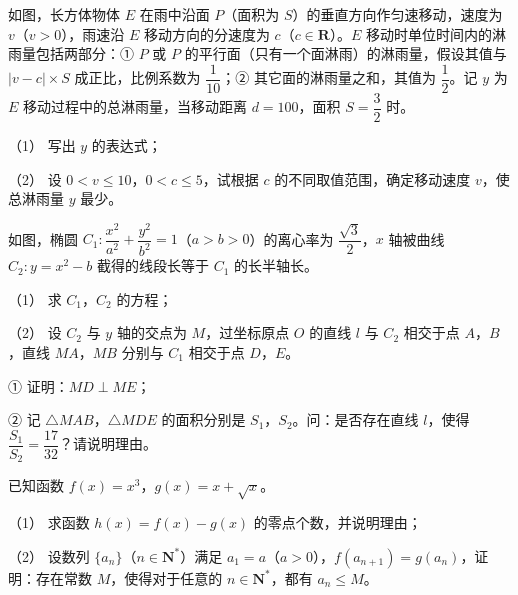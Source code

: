 \begin{question}
如图，长方体物体 $E$ 在雨中沿面 $P$（面积为 $S$）的垂直方向作匀速移动，速度为 $v$（$v>0$），雨速沿 $E$ 移动方向的分速度为 $c$（$c\in\mathbf R$）。$E$ 移动时单位时间内的淋雨量包括两部分：① $P$ 或 $P$ 的平行面（只有一个面淋雨）的淋雨量，假设其值与 $|v-c|\times S$ 成正比，比例系数为 $\dfrac1{10}$；② 其它面的淋雨量之和，其值为 $\dfrac12$。记 $y$ 为 $E$ 移动过程中的总淋雨量，当移动距离 $d=100$，面积 $S=\dfrac32$ 时。

（1） 写出 $y$ 的表达式；

（2） 设 $0<v\leqslant10$，$0<c\leqslant5$，试根据 $c$ 的不同取值范围，确定移动速度 $v$，使总淋雨量 $y$ 最少。
\nopagebreak[4]
\begin{center}\end{center}
\nopagebreak[4]
\Needspace{0.4\textheight}
\end{question}
\begin{question}
如图，椭圆 $C_1:\dfrac{x^2}{a^2}+\dfrac{y^2}{b^2}=1$（$a>b>0$）的离心率为 $\dfrac{\sqrt3}2$，$x$ 轴被曲线 $C_2:y=x^2-b$ 截得的线段长等于 $C_1$ 的长半轴长。

（1） 求 $C_1$，$C_2$ 的方程；

（2） 设 $C_2$ 与 $y$ 轴的交点为 $M$，过坐标原点 $O$ 的直线 $l$ 与 $C_2$ 相交于点 $A$，$B$，直线 $MA$，$MB$ 分别与 $C_1$ 相交于点 $D$，$E$。

① 证明：$MD\perp ME$；

② 记 $\triangle MAB$，$\triangle MDE$ 的面积分别是 $S_1$，$S_2$。问：是否存在直线 $l$，使得 $\dfrac{S_1}{S_2}=\dfrac{17}{32}$？请说明理由。
\nopagebreak[4]
\begin{center}\end{center}
\nopagebreak[4]
\end{question}
\begin{question}
已知函数 $f(x)=x^3$，$g(x)=x+\sqrt x$。

（1） 求函数 $h(x)=f(x)-g(x)$ 的零点个数，并说明理由；

（2） 设数列 $\{a_n\}$（$n\in\mathbf N^*$）满足 $a_1=a$（$a>0$），$f(a_{n+1})=g(a_n)$，证明：存在常数 $M$，使得对于任意的 $n\in\mathbf N^*$，都有 $a_n\leqslant M$。

\end{question}